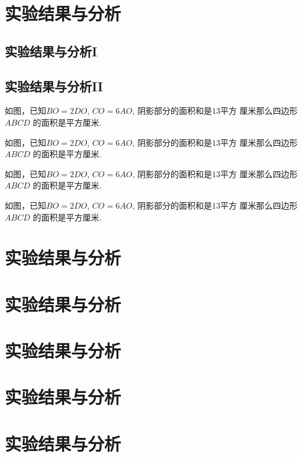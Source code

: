 \documentclass{USTBBook}
\begin{document}
\chapter{实验结果与分析}
\section{实验结果与分析I}
\zhlipsum[14]

\section{实验结果与分析II}

\begin{question}
  如图，已知$BO=2DO$, $CO=6AO$, 阴影部分的面积和是$13$平方
  厘米那么四边形 $ABCD$ 的面积是\fillin[]平方厘米.
\end{question}

\begin{question}
  如图，已知$BO=2DO$, $CO=6AO$, 阴影部分的面积和是$13$平方
  厘米那么四边形 $ABCD$ 的面积是\fillin[]平方厘米.
\end{question}

\begin{question}
  如图，已知$BO=2DO$, $CO=6AO$, 阴影部分的面积和是$13$平方
  厘米那么四边形 $ABCD$ 的面积是\fillin[]平方厘米.
\end{question}

\begin{question}
  如图，已知$BO=2DO$, $CO=6AO$, 阴影部分的面积和是$13$平方
  厘米那么四边形 $ABCD$ 的面积是\fillin[]平方厘米.
\end{question}

\chapter{实验结果与分析}
\zhlipsum[14]

\chapter{实验结果与分析}
\zhlipsum[14]

\chapter{实验结果与分析}
\zhlipsum[14]

\chapter{实验结果与分析}
\zhlipsum[14]

\chapter{实验结果与分析}
\zhlipsum[14]

\backmatter
\makeBackCover
\end{document}

